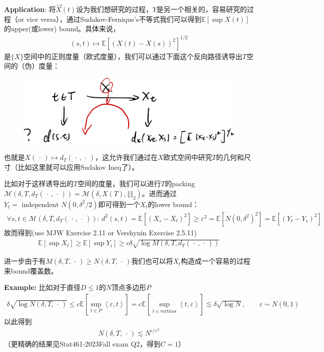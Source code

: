\documentclass[11pt,a4paper]{ctexart}
\numberwithin{equation}{section}%
\begin{document}
\textbf{Application}: 将$ \vec{X}(t) $设为我们想研究的过程，$ Y $是另一个相关的，容易研究的过程（or vice versa），通过Sudakov-Fernique's不等式我们可以得到$ \mathbb{E}\left[ \sup X(t) \right]  $的upper(或lower) bound。具体来说，
\begin{align*}
    (s,t)\mapsto \mathbb{E}\left[ (X(t)-X(s))^2 \right] ^{1/2}
\end{align*}
是$ \{X\} $空间中的正则度量（欧式度量），我们可以通过下面这个反向路径诱导出$ T $空间的（伪）度量：
\begin{figure}[H]
    \centering
    \includegraphics[width=0.7\linewidth]{images/2024-08-29-17-10-32.png}
\end{figure}
也就是$ X(\, \cdot \, )\mapsto d_T(\, \cdot \, ,\, \cdot \, ) $，这允许我们通过在$ X $欧式空间中研究$ T $的几何和尺寸（比如这里就可以应用Sudakov Ineq了）。

比如对于这样诱导出的$ T $空间的度量，我们可以进行$ T $的packing$ \mathcal{M}(\delta , T, d_T(\, \cdot \, ,\, \cdot \, ))= \mathcal{M}(\delta , X(T), \left\Vert  \right\Vert _2) $。进而通过$ Y_t=\text{ independent }N(0,\delta  ^2/2)  $即可得到一个$ X_t $的lower bound：
\begin{align*}
    \forall s,t\in\mathcal{M}(\delta , T, d_T(\, \cdot \, ,\, \cdot \, )):\, d^2(s,t)=\mathbb{E}\left[ (X_s-X_t)^2  \right]  \geq \varepsilon ^2  = \mathbb{E}\left[ N(0,\delta ^2)^2 \right]= \mathbb{E}\left[ (Y_t-Y_s)^2 \right]  
\end{align*}
故而得到(use MJW Exercise 2.11 or Vershynin Exercise 2.5.11)
\begin{align*}
    \mathbb{E}\left[ \sup X_t \right] \geq  \mathbb{E}\left[ \sup Y_i \right] \geq c\delta \sqrt{\log M(\delta , T, d_T(\, \cdot \, ,\, \cdot \, ))} 
\end{align*}


进一步由于有$ M(\delta ,T, \, \cdot \, )\geq N(\delta,T, \, \cdot \, ) $我们也可以将$ X_t $构造成一个容易的过程来bound覆盖数。

\textbf{Example:} 比如对于直径$ D\leq 1 $的$ N $顶点多边形$ P $
\begin{align*}
    \delta \sqrt{\log N(\delta ,T, \, \cdot \, )}\leq c \mathbb{E}\left[ \sup_{t\in P}\left\langle \varepsilon ,t \right\rangle  \right] = c\mathbb{E}\left[ \sup_{t\in \text{vertices}} \left\langle t,\varepsilon  \right\rangle  \right] \lesssim \delta \sqrt{\log N},\qquad \varepsilon \sim N(0,1)
\end{align*}
以此得到
\begin{align*}
    N(\delta ,T, \, \cdot \, )\lesssim N^{c/\varepsilon ^2} 
\end{align*}
（更精确的结果见Stat461-2023Fall exam Q2，得到$ C=1 $）
\end{document}
